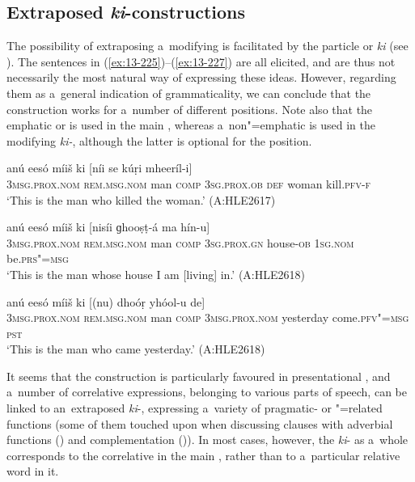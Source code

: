 \subsection{Extraposed \textit{ki}-constructions}
\label{subsec:13-6-7}

The possibility of extraposing a~modifying  is facilitated by the particle or  \textit{ki} (see ). The sentences in (\ref{ex:13-225})--(\ref{ex:13-227}) are all elicited, and are thus not necessarily the most natural way of expressing these ideas. However, regarding them as a~general indication of grammaticality, we can conclude that the construction works for a~number of different positions. Note also that the emphatic or   is used in the main , whereas a~non"=emphatic   is used in the modifying \textit{ki-}, although the latter is optional for the  position.

\begin{exe}
\ex
\label{ex:13-225}
\gll anú eesó míiš ki [níi  se kúṛi mheeríl-i] \\
\textsc{3msg.prox.nom} \textsc{rem.msg.nom} man \textsc{comp} \textsc{3sg.prox.ob} \textsc{def} woman kill.\textsc{pfv-f} \\
\glt `This is the man who killed the woman.' (A:HLE2617)

\ex
\label{ex:13-226}
\gll anú eesó míiš ki [nisíi  ɡhooṣṭ-á ma hín-u] \\
\textsc{3msg.prox.nom} \textsc{rem.msg.nom} man \textsc{comp} \textsc{3sg.prox.gn} house-\textsc{ob} \textsc{1sg.nom} be.\textsc{prs"=msg} \\
\glt `This is the man whose house I am [living] in.' (A:HLE2618)

\ex
\label{ex:13-227}
\gll anú eesó míiš ki [(nu)  dhoóṛ yhóol-u de] \\
\textsc{3msg.prox.nom} \textsc{rem.msg.nom} man \textsc{comp} \textsc{3msg.prox.nom} yesterday come.\textsc{pfv"=msg} \textsc{pst} \\
\glt `This is the man who came yesterday.' (A:HLE2618) 
\end{exe}

It seems that the construction is particularly favoured in presentational , and a~number of correlative expressions, belonging to various parts of speech, can be linked to an~extraposed \textit{ki}-, expressing a~variety of pragmatic- or "=related functions (some of them touched upon when discussing clauses with adverbial functions () and complementation ()). In most cases, however, the \textit{ki}- as a~whole corresponds to the correlative in the main , rather than to a~particular relative word in it.

